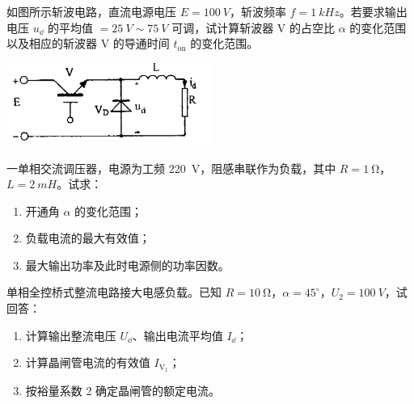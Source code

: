 \documentclass[电力电子]{subfiles}
\begin{document}
\begin{ti}[10 分]
	如图所示斩波电路，直流电源电压 $E = \SI{100}{V}$，斩波频率 $f = \SI{1}{kHz}$。若要求输出电压 $u_{\dd}$ 的平均值 $= \SI{25}{V} \sim \SI{75}{V}$ 可调，试计算斩波器 V 的占空比 $\alpha$ 的变化范围以及相应的斩波器 V 的导通时间 $t_{\mathrm{on}}$ 的变化范围。
	\begin{center}
		\includegraphics[width=0.5\textwidth]{figure/fig13.png}
	\end{center}
\end{ti}

\begin{ti}[10 分]
	一单相交流调压器，电源为工频 \SI{220}{V}，阻感串联作为负载，其中 $R = \SI{1}{\ohm}$，$L = \SI{2}{mH}$。试求：
	\begin{enumerate}
		\item 开通角 $\alpha$ 的变化范围；
		\item 负载电流的最大有效值；
		\item 最大输出功率及此时电源侧的功率因数。
	\end{enumerate}
\end{ti}

\begin{ti}[10 分]
	单相全控桥式整流电路接大电感负载。已知 $R = \SI{10}{\ohm}$，$\alpha = 45^\circ$，$U_{2} = \SI{100}{V}$，试回答：
	\begin{enumerate}
		\item 计算输出整流电压 $U_{\dd}$、输出电流平均值 $I_{\dd}$；
		\item 计算晶闸管电流的有效值 $I_{\mathrm{V}_{1}}$；
		\item 按裕量系数 2 确定晶闸管的额定电流。
	\end{enumerate}
\end{ti}
\end{document}
